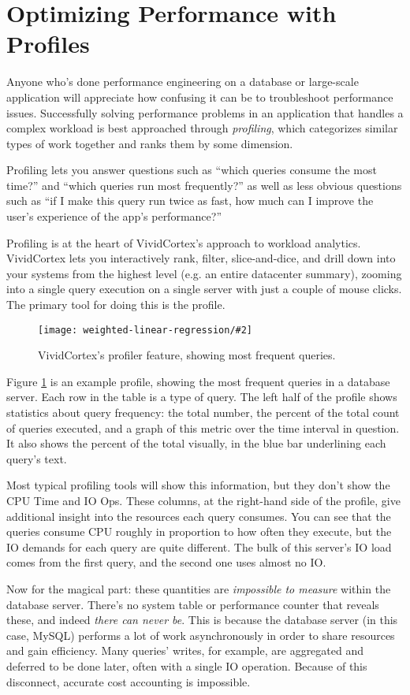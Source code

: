 \documentclass{vivid_layout}
\newcommand{\myfig}[3]{
	\begin{figure}[!htpb]
	\begin{center}
	\rule{0mm}{5mm}
	\texttt{[image: weighted-linear-regression/\#2]}
	\caption{#3}\label{fig:#2}
	\end{center}
	\end{figure}
}
\begin{document}
\section{Optimizing Performance with Profiles}

Anyone who's done performance engineering on a database or large-scale application will appreciate how confusing it can be to troubleshoot performance issues. Successfully solving performance problems in an application that handles a complex workload is best approached through \emph{profiling}, which categorizes similar types of work together and ranks them by some dimension.

Profiling lets you answer questions such as ``which queries consume the most time?'' and ``which queries run most frequently?'' as well as less obvious questions such as ``if I make this query run twice as fast, how much can I improve the user's experience of the app's performance?''

Profiling is at the heart of VividCortex's approach to workload analytics. VividCortex lets you interactively rank, filter, slice-and-dice, and drill down into your systems from the highest level (e.g. an entire datacenter summary), zooming into a single query execution on a single server with just a couple of mouse clicks. The primary tool for doing this is the profile.

\myfig{\textwidth}{profiler}{VividCortex's profiler feature, showing most frequent queries.}

Figure \ref{fig:profiler} is an example profile, showing the most frequent queries in a database server. Each row in the table is a type of query. The left half of the profile shows statistics about query frequency: the total number, the percent of the total count of queries executed, and a graph of this metric over the time interval in question. It also shows the percent of the total visually, in the blue bar underlining each query's text.

Most typical profiling tools will show this information, but they don't show the CPU Time and IO Ops. These columns, at the right-hand side of the profile, give additional insight into the resources each query consumes. You can see that the queries consume CPU roughly in proportion to how often they execute, but the IO demands for each query are quite different. The bulk of this server's IO load comes from the first query, and the second one uses almost no IO.

Now for the magical part: these quantities are \emph{impossible to measure} within the database server. There's no system table or performance counter that reveals these, and indeed \emph{there can never be}. This is because the database server (in this case, MySQL) performs a lot of work asynchronously in order to share resources and gain efficiency. Many queries' writes, for example, are aggregated and deferred to be done later, often with a single IO operation. Because of this disconnect, accurate cost accounting is impossible.
\end{document}
